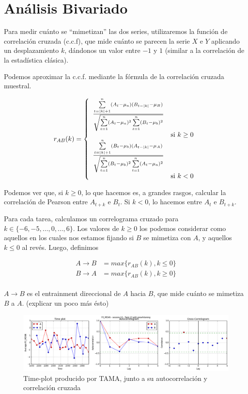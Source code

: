 \section{Análisis Bivariado}

\newcommand{\varnorm}[1] {
    (#1_t - \mu_{\lowercase{#1}})
}

\newcommand{\squarederr}[1]{
    \sum\limits_{t=1}^n \varnorm{#1}^2
}

\newcommand{\crosscorr}[2]{
  \frac{\sum\limits_{t=|k|+1}^n \varnorm{#1} (#2_{t-|k|} - \mu_{#2})}{
    \sqrt{\squarederr{#1} \squarederr{#2}}
  } \\
}

Para medir cuánto se ``mimetizan'' las dos series, utilizaremos la función de correlación cruzada (c.c.f), que mide cuánto se parecen la serie $X$ e $Y$ aplicando un desplazamiento $k$, dándonos un valor entre $-1$ y $1$ (similar a la correlación de la estadística clásica).

Podemos aproximar la c.c.f. mediante la fórmula de la correlación cruzada muestral.

\begin{equation}
  r_{AB}(k) =
  \left\{
    \begin{array}{ll}
      \crosscorr{A}{B} & \mbox{si } k \geq 0 \\
      \crosscorr{B}{A} & \mbox{si } k < 0
    \end{array}
  \right.
\end{equation}

Podemos ver que, si $k \geq 0$, lo que hacemos es, a grandes rasgos, calcular la correlación de Pearson entre $A_{t+k}$ e $B_t$. Si $k < 0$, lo hacemos entre $A_t$ e $B_{t+k}$.

Para cada tarea, calculamos un correlograma cruzado para $k \in \{-6, -5, \ldots, 0, \ldots , 6\}$. Los valores de $k \geq 0$ los podemos considerar como aquellos en los cuales nos estamos fijando si $B$ se mimetiza con $A$, y aquellos $k \leq 0$ al revés. Luego, definimos

\begin{align}
  A \rightarrow B &= max \{ r_{AB}(k), k \leq 0 \} \\
  B \rightarrow A &= max \{ r_{AB}(k), k \geq 0 \} \\
\end{align}


$A \rightarrow B$ es el entrainment direccional de $A$ hacia $B$, que mide cuánto se mimetiza $B$ a $A$. (explicar un poco más ésto)

\begin{figure}
\centering
\includegraphics[width=15cm]{images/time_plot_with_cross_correlation.png}
\caption{Time-plot producido por TAMA, junto a su autocorrelación y correlación cruzada\label{time_plot_with_bivariate}}

\end{figure}
